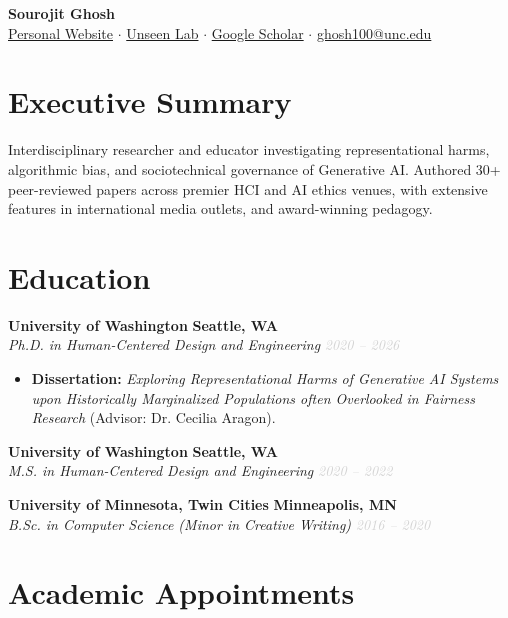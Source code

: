 \documentclass[10pt, letterpaper]{article}
\newcommand{\expheader}[4]{%
  \noindent\textbf{\large #1} \hfill \textbf{#2}\\
  \textit{#3} \hfill \textcolor{lightgray}{\small\textit{#4}}\par\vspace{2pt}
}
\begin{document}
\pagestyle{empty}

\begin{center}
  {\huge\bfseries Sourojit Ghosh}\\[3pt]
  
  {\small \href{https://sourojitghosh.github.io/}{Personal Website} $\cdot$ \href{https://sourojitghosh.github.io/unseen-lab/}{Unseen Lab} $\cdot$ \href{https://scholar.google.com/citations?user=fNxrh48AAAAJ&hl=en&authuser=2}{Google Scholar}} $\cdot$ \href{mailto:ghosh100@unc.edu}{ghosh100@unc.edu}\\[5pt]
\end{center}

\vspace{-4pt}

\section{Executive Summary}
Interdisciplinary researcher and educator investigating representational harms, algorithmic bias, and sociotechnical governance of Generative AI. Authored 30+ peer-reviewed papers across premier HCI and AI ethics venues, with extensive features in international media outlets, and award-winning pedagogy.

\section{Education}

\expheader{University of Washington}{Seattle, WA}{Ph.D. in Human-Centered Design and Engineering}{2020 -- 2026}
\vspace{-2pt}
\begin{itemize}[leftmargin=1.2em, itemsep=0pt, topsep=1pt, parsep=1pt]
  \item \textbf{Dissertation:} \textit{Exploring Representational Harms of Generative AI Systems upon Historically Marginalized Populations often Overlooked in Fairness Research} (Advisor: Dr. Cecilia Aragon).
\end{itemize}

\expheader{University of Washington}{Seattle, WA}{M.S. in Human-Centered Design and Engineering}{2020 -- 2022}
\expheader{University of Minnesota, Twin Cities}{Minneapolis, MN}{B.Sc. in Computer Science (Minor in Creative Writing)}{2016 -- 2020}

\section{Academic Appointments}
\end{document}
